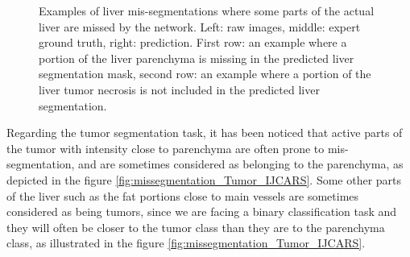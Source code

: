 \begin{figure}[!ht]
\begin{minipage}{4cm}
	\end{minipage}
	\caption{Examples of liver mis-segmentations where some parts of the actual liver are missed by the network. Left: raw images, middle: expert ground truth, right: prediction. First row: an example where a portion of the liver parenchyma is missing in the predicted liver segmentation mask, second row: an example where a portion of the liver tumor necrosis is not included in the predicted liver segmentation.}
	\label{fig:missegmentation_Liver2_IJCARS}
\end{figure} 

Regarding the tumor segmentation task, it has been noticed that active parts of the tumor with intensity close to parenchyma are often prone to mis-segmentation, and are sometimes considered as belonging to the parenchyma, as depicted in the figure \ref{fig:missegmentation_Tumor_IJCARS}. Some other parts of the liver such as the fat portions close to main vessels are sometimes considered as being tumors, since we are facing a binary classification task and they will often be closer to the tumor class than they are to the parenchyma class, as illustrated in the figure \ref{fig:missegmentation_Tumor_IJCARS}.
